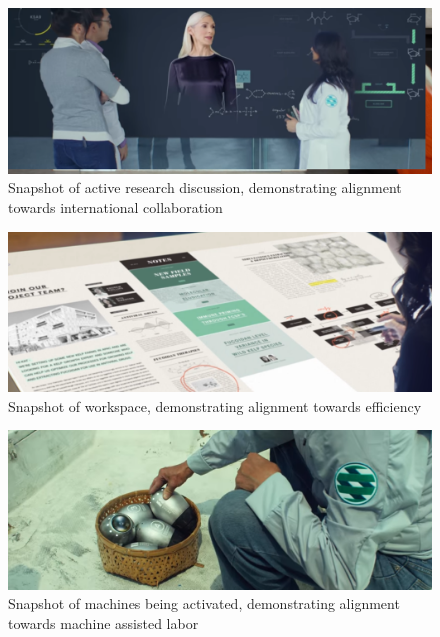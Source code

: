 \begin{figure}[H]
    \centering
    \includegraphics[width=1\textwidth]{images/ProCollab.png}
    \caption{Snapshot of active research discussion, demonstrating alignment towards international collaboration}
    \label{fig:collab}
\end{figure}  

\begin{figure}[H]
    \centering
    \includegraphics[width=1\textwidth]{images/ProEfficiency.png}
    \caption{Snapshot of workspace, demonstrating alignment towards efficiency}
    \label{fig:work}
\end{figure} 

\begin{figure}[H]
    \centering
    \includegraphics[width=1\textwidth]{images/ProMachines.png}
    \caption{Snapshot of machines being activated, demonstrating alignment towards machine assisted labor}
    \label{fig:labor}
\end{figure} 

